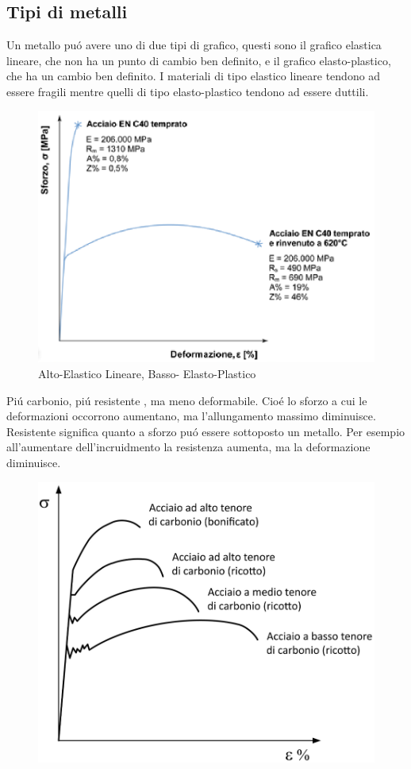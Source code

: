 \documentclass{article}
\begin{document}
{        \subsection{Tipi di metalli}
            Un metallo pu\'o avere uno di due tipi di grafico, questi sono il grafico elastica lineare, che non ha un punto di cambio ben definito, e il grafico elasto-plastico, che ha un cambio ben definito. I materiali di tipo elastico lineare tendono ad essere fragili mentre quelli di tipo elasto-plastico tendono ad essere duttili.
            \begin{figure}[!h]
                    \centering
                    \includegraphics[width=.85\linewidth]{Esempio Elastico Lineare e Elasto-Plastico.png}
                    \caption{Alto-Elastico Lineare, Basso- Elasto-Plastico}
            \end{figure}
            Pi\'u carbonio, pi\'u resistente , ma meno deformabile. Cio\'e lo sforzo a cui le deformazioni occorrono aumentano, ma l'allungamento massimo diminuisce. Resistente significa quanto a sforzo pu\'o essere sottoposto un metallo. Per esempio all'aumentare dell'incruidmento la  resistenza aumenta, ma la deformazione diminuisce.
            \begin{figure}[!h]
                    \centering
                    \includegraphics[width=.85\linewidth]{Grafici di Accaio con differenza di Carbonio.png}

\end{figure}}
\end{document}
